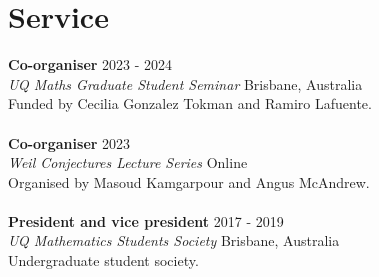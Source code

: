 \documentclass[8pt]{amsart}
\begin{document}
\section*{\LARGE Service}
\textbf{Co-organiser} \hfill 2023 - 2024 \\
\emph{UQ Maths Graduate Student Seminar} \hfill Brisbane, Australia \\
Funded by Cecilia Gonzalez Tokman and Ramiro Lafuente. \\
\ \\
\textbf{Co-organiser} \hfill 2023 \\
\emph{Weil Conjectures Lecture Series} \hfill Online \\
Organised by Masoud Kamgarpour and Angus McAndrew. \\
\ \\
\textbf{President and vice president} \hfill 2017 - 2019 \\ 
\emph{UQ Mathematics Students Society} \hfill Brisbane, Australia \\
Undergraduate student society. 
\end{document}
